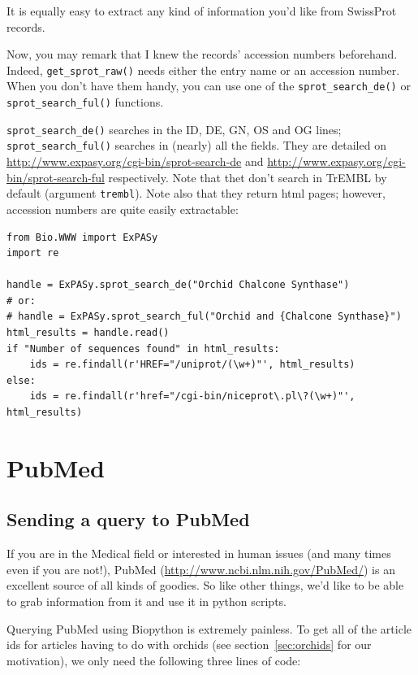 \documentclass{report}
\begin{document}
It is equally easy to extract any kind of information you'd like from SwissProt records.


Now, you may remark that I knew the records' accession numbers
beforehand. Indeed, \verb|get_sprot_raw()| needs either the entry name
or an accession number. When you don't have them handy, you can use
one of the \verb|sprot_search_de()| or \verb|sprot_search_ful()|
functions.

\verb|sprot_search_de()| searches in the ID, DE, GN, OS and OG lines;
\verb|sprot_search_ful()| searches in (nearly) all the fields. They
are detailed on
\url{http://www.expasy.org/cgi-bin/sprot-search-de} and
\url{http://www.expasy.org/cgi-bin/sprot-search-ful}
respectively. Note that thet don't search in TrEMBL by default
(argument \verb|trembl|). Note also that they return html pages;
however, accession numbers are quite easily extractable:

\begin{verbatim}
from Bio.WWW import ExPASy
import re

handle = ExPASy.sprot_search_de("Orchid Chalcone Synthase")
# or:
# handle = ExPASy.sprot_search_ful("Orchid and {Chalcone Synthase}")
html_results = handle.read()
if "Number of sequences found" in html_results:
    ids = re.findall(r'HREF="/uniprot/(\w+)"', html_results)
else:
    ids = re.findall(r'href="/cgi-bin/niceprot\.pl\?(\w+)"', html_results)
\end{verbatim}

\section{PubMed}
\label{sec:pub_med}

\subsection{Sending a query to PubMed}

If you are in the Medical field or interested in human issues (and many times even if you are not!), PubMed (\url{http://www.ncbi.nlm.nih.gov/PubMed/}) is an excellent source of all kinds of goodies. So like other things, we'd like to be able to grab information from it and use it in python scripts.


Querying PubMed using Biopython is extremely painless. To get all of the article ids for articles having to do with orchids (see section~\ref{sec:orchids} for our motivation), we only need the following three lines of code:
\end{document}
